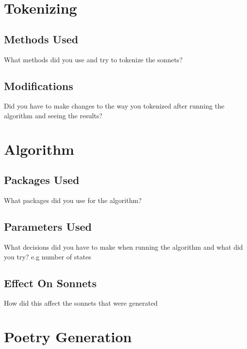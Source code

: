 
\newcommand{\boldline}[1]{\underline{\textbf{#1}}}



\pagestyle{fancy}

\section{Tokenizing}
\subsection{Methods Used}
What methods did you use and try to tokenize the sonnets?
\subsection{Modifications}
Did you have to make changes to the way you tokenized after running the algorithm and seeing the results?

\section{Algorithm}
\subsection{Packages Used}
What packages did you use for the algorithm?
\subsection{Parameters Used}
What decisions did you have to make when running the algorithm and what did you try? e.g number of states
\subsection{Effect On Sonnets}
How did this affect the sonnets that were generated

\section{Poetry Generation}
